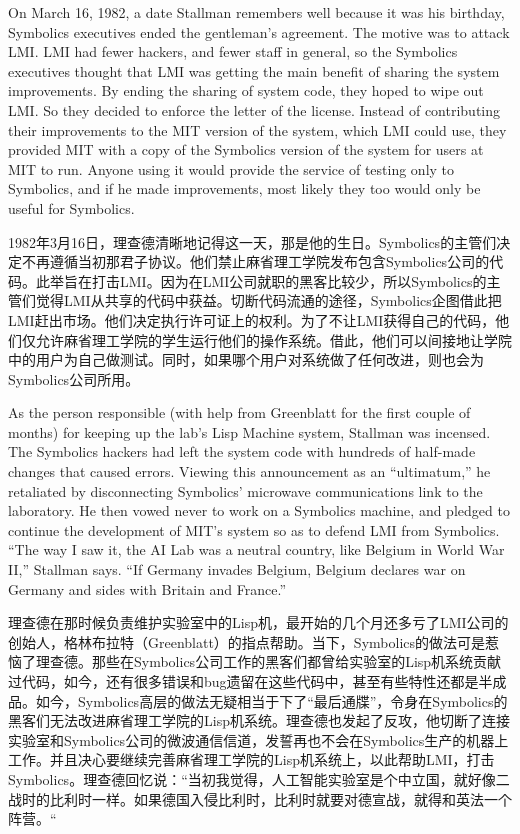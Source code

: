\ifdefined\eng
On March 16, 1982, a date Stallman remembers well because it was his birthday, Symbolics executives ended the gentleman's agreement. The motive was to attack LMI. LMI had fewer hackers, and fewer staff in general, so the Symbolics executives thought that LMI was getting the main benefit of sharing the system improvements.  By ending the sharing of system code, they hoped to wipe out LMI.  So they decided to enforce the letter of the license.  Instead of contributing their improvements to the MIT version of the system, which LMI could use, they provided MIT with a copy of the Symbolics version of the system for users at MIT to run.  Anyone using it would provide the service of testing only to Symbolics, and if he made improvements, most likely they too would only be useful for Symbolics.
\fi

\ifdefined\chs
1982年3月16日，理查德清晰地记得这一天，那是他的生日。Symbolics的主管们决定不再遵循当初那君子协议。他们禁止麻省理工学院发布包含Symbolics公司的代码。此举旨在打击LMI。因为在LMI公司就职的黑客比较少，所以Symbolics的主管们觉得LMI从共享的代码中获益。切断代码流通的途径，Symbolics企图借此把LMI赶出市场。他们决定执行许可证上的权利。为了不让LMI获得自己的代码，他们仅允许麻省理工学院的学生运行他们的操作系统。借此，他们可以间接地让学院中的用户为自己做测试。同时，如果哪个用户对系统做了任何改进，则也会为Symbolics公司所用。
\fi

\ifdefined\eng
As the person responsible (with help from Greenblatt for the first couple of months) for keeping up the lab's Lisp Machine system, Stallman was incensed. The Symbolics hackers had left the system code with hundreds of half-made changes that caused errors. Viewing this announcement as an ``ultimatum,'' he retaliated by disconnecting Symbolics' microwave communications link to the laboratory. He then vowed never to work on a Symbolics machine, and pledged to continue the development of MIT's system so as to defend LMI from Symbolics. ``The way I saw it, the AI Lab was a neutral country, like Belgium in World War II,'' Stallman says. ``If Germany invades Belgium, Belgium declares war on Germany and sides with Britain and France.''
\fi

\ifdefined\chs
理查德在那时候负责维护实验室中的Lisp机，最开始的几个月还多亏了LMI公司的创始人，格林布拉特（Greenblatt）的指点帮助。当下，Symbolics的做法可是惹恼了理查德。那些在Symbolics公司工作的黑客们都曾给实验室的Lisp机系统贡献过代码，如今，还有很多错误和bug遗留在这些代码中，甚至有些特性还都是半成品。如今，Symbolics高层的做法无疑相当于下了“最后通牒”，令身在Symbolics的黑客们无法改进麻省理工学院的Lisp机系统。理查德也发起了反攻，他切断了连接实验室和Symbolics公司的微波通信信道，发誓再也不会在Symbolics生产的机器上工作。并且决心要继续完善麻省理工学院的Lisp机系统上，以此帮助LMI，打击Symbolics。理查德回忆说：“当初我觉得，人工智能实验室是个中立国，就好像二战时的比利时一样。如果德国入侵比利时，比利时就要对德宣战，就得和英法一个阵营。“
\fi


